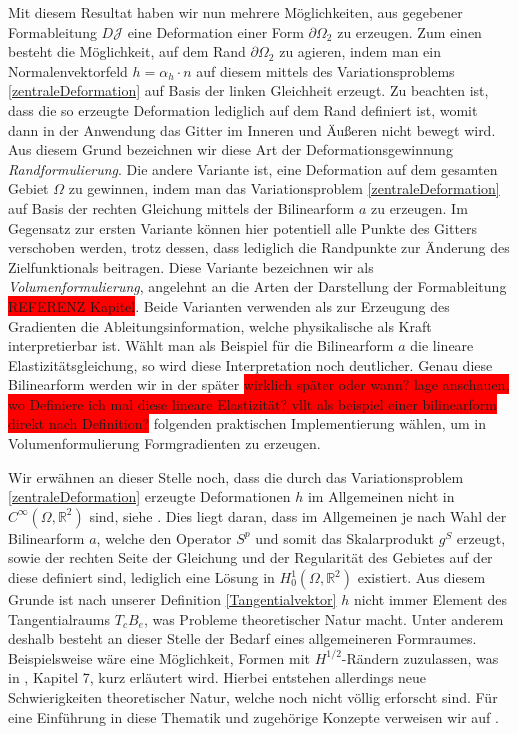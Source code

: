 \documentclass[bibliography=totoc,12pt,a4paper]{scrartcl}
\theoremstyle{exampstyle}
\numberwithin{equation}{section}
\begin{document}
Mit diesem Resultat haben wir nun mehrere Möglichkeiten, aus gegebener Formableitung $D\mathcal{J}$ eine Deformation einer Form $\partial\Omega_2$ zu erzeugen. Zum einen besteht die Möglichkeit, auf dem Rand $\partial\Omega_2$ zu agieren, indem man ein Normalenvektorfeld $h = \alpha_h \cdot n$ auf diesem mittels des Variationsproblems \ref{zentraleDeformation} auf Basis der linken Gleichheit erzeugt. Zu beachten ist, dass die so erzeugte Deformation lediglich auf dem Rand definiert ist, womit dann in der Anwendung das Gitter im Inneren und Äußeren nicht bewegt wird. Aus diesem Grund bezeichnen wir diese Art der Deformationsgewinnung \textit{Randformulierung}. Die andere Variante ist, eine Deformation auf dem gesamten Gebiet $\Omega$ zu gewinnen, indem man das Variationsproblem \ref{zentraleDeformation} auf Basis der rechten Gleichung mittels der Bilinearform 
$a$ zu erzeugen. Im Gegensatz zur ersten Variante können hier potentiell alle Punkte des Gitters verschoben werden, trotz dessen, dass lediglich die Randpunkte zur Änderung des Zielfunktionals beitragen. Diese Variante bezeichnen wir als \textit{Volumenformulierung}, angelehnt an die Arten der Darstellung der Formableitung \colorbox{red}{REFERENZ Kapitel}. Beide Varianten verwenden als zur Erzeugung des Gradienten die Ableitungsinformation, welche physikalische als Kraft interpretierbar ist. Wählt man als Beispiel für die Bilinearform $a$ die lineare Elastizitätsgleichung, so wird diese Interpretation noch deutlicher. Genau diese Bilinearform werden wir in der später \colorbox{red}{wirklich später oder wann? lage anschauen, wo Definiere ich mal diese lineare Elastizität? vllt als beispiel einer bilinearform direkt nach Definition?} folgenden praktischen Implementierung wählen, um in Volumenformulierung Formgradienten zu erzeugen.

Wir erwähnen an dieser Stelle noch, dass die durch das Variationsproblem \ref{zentraleDeformation} erzeugte Deformationen $h$ im Allgemeinen nicht in $C^\infty(\Omega,\mathbb{R}^2)$ sind, siehe \cite{bfgs1}. Dies liegt daran, dass im Allgemeinen je nach Wahl der Bilinearform $a$, welche den Operator $S^p$ und somit das Skalarprodukt $g^S$ erzeugt, sowie der rechten Seite der Gleichung und der Regularität des Gebietes auf der diese definiert sind, lediglich eine Lösung in $H^1_0(\Omega,\mathbb{R}^2)$ existiert. Aus diesem Grunde ist nach unserer Definition \ref{Tangentialvektor} $h$ nicht immer Element des Tangentialraums $T_cB_e$, was Probleme theoretischer Natur macht. Unter anderem deshalb besteht an dieser Stelle der Bedarf eines allgemeineren Formraumes. Beispielsweise wäre eine Möglichkeit, Formen mit $H^{1/2}$-Rändern zuzulassen, was in \cite{shape_space}, Kapitel 7, kurz erläutert wird. Hierbei entstehen allerdings neue Schwierigkeiten theoretischer Natur, welche noch nicht völlig erforscht sind. Für eine Einführung in diese Thematik und zugehörige Konzepte verweisen wir auf \cite{diffeology}.
\end{document}
